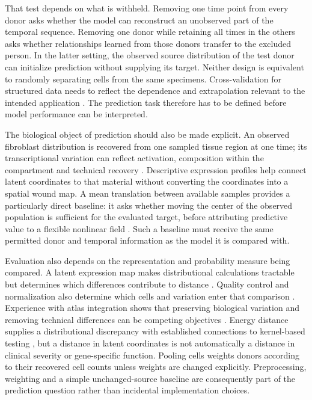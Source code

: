\documentclass[10pt,a4paper]{article}
\begin{document}
That test depends on what is withheld. Removing one time point from every donor asks whether the model can reconstruct an unobserved part of the temporal sequence. Removing one donor while retaining all times in the others asks whether relationships learned from those donors transfer to the excluded person. In the latter setting, the observed source distribution of the test donor can initialize prediction without supplying its target. Neither design is equivalent to randomly separating cells from the same specimens. Cross-validation for structured data needs to reflect the dependence and extrapolation relevant to the intended application \citep{roberts2017}. The prediction task therefore has to be defined before model performance can be interpreted.

The biological object of prediction should also be made explicit. An observed fibroblast distribution is recovered from one sampled tissue region at one time; its transcriptional variation can reflect activation, composition within the compartment and technical recovery \citep{rognoni2018,heumos2023}. Descriptive expression profiles help connect latent coordinates to that material without converting the coordinates into a spatial wound map. A mean translation between available samples provides a particularly direct baseline: it asks whether moving the center of the observed population is sufficient for the evaluated target, before attributing predictive value to a flexible nonlinear field \citep{schiebinger2019}. Such a baseline must receive the same permitted donor and temporal information as the model it is compared with.

Evaluation also depends on the representation and probability measure being compared. A latent expression map makes distributional calculations tractable but determines which differences contribute to distance \citep{lopez2018}. Quality control and normalization also determine which cells and variation enter that comparison \citep{heumos2023}. Experience with atlas integration shows that preserving biological variation and removing technical differences can be competing objectives \citep{luecken2022}. Energy distance supplies a distributional discrepancy with established connections to kernel-based testing \citep{szekely2013,sejdinovic2013}, but a distance in latent coordinates is not automatically a distance in clinical severity or gene-specific function. Pooling cells weights donors according to their recovered cell counts unless weights are changed explicitly. Preprocessing, weighting and a simple unchanged-source baseline are consequently part of the prediction question rather than incidental implementation choices.
\end{document}
